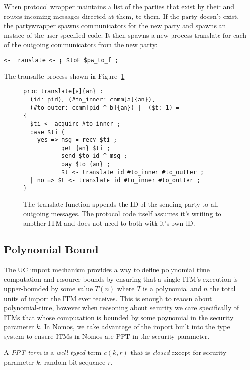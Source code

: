 When protocol wrapper maintains a list of the parties that exist by their  and routes incoming messages directed at them, to them.
If the party doesn't exist, the partywrapper spawns communicators for the new party and spawns an instace of the user specified code.
It then spawns a new process translate for each of the outgoing communicators from the new party:

\begin{lstlisting}
<- translate <- p $toF $pw_to_f ;
\end{lstlisting}

The transalte process shown in Figure~\ref{lst:translate}

\begin{figure}
\begin{lstlisting}[basicstyle=\small\ttfamily]
proc translate[a]{an} :
  (id: pid), (#to_inner: comm[a]{an}), 
  (#to_outer: comm[pid ^ b]{an}) |- ($t: 1) =
{
  $ti <- acquire #to_inner ;
  case $ti (
    yes => msg = recv $ti ;
           get {an} $ti ;
           send $to id ^ msg ;
           pay $to {an} ;
           $t <- translate id #to_inner #to_outter ;
  | no => $t <- translate id #to_inner #to_outter ;
}
\end{lstlisting}
\caption{The translate function appends the ID of the sending party to all outgoing messages. The protocol code itself assumes it's writing to another ITM and does not need to both with it's own ID.}
\label{lst:translate}
\end{figure}

\subsection{Polynomial Bound}
The UC import mechanism provides a way to define polynomial time computation and resource-bounds by ensuring that a single ITM's execution is upper-bounded by some value $T(n)$ where $T$ is a polynomial and $n$ the total units of import the ITM ever receives.
This is enough to reaosn about polynomial-time, however when reasoning about security we care specifically of ITMs that whose computation is bounded by some poynomial in the security parameter $k$. 
In Nomos, we take advantage of the import built into the type system to ensure ITMs in Nomos are PPT in the security parameter. 

\begin{definition}\label{def:pptterm}
A \textit{PPT term} is a \textit{well-typed} term $e(k, r)$ that is \textit{closed} except for security parameter $k$, random bit sequence $r$.
\end{definition}

